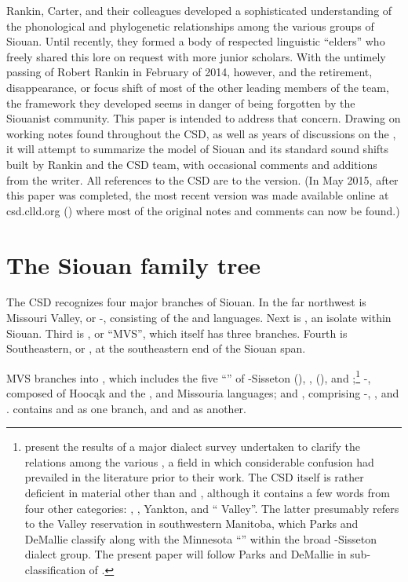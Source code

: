\documentclass[output=paper]{LSP/langsci}
\begin{document}
Rankin, Carter, and their colleagues developed a sophisticated understanding of the phonological and phylogenetic relationships among the various groups of Siouan.  Until recently, they formed a body of respected linguistic ``elders'' who freely shared this lore on request with more junior scholars.  With the untimely passing of Robert Rankin in February of 2014, however, and the retirement, disappearance, or focus shift of most of the other leading members of the team, the framework they developed seems in danger of being forgotten by the Siouanist community.  This paper is intended to address that concern.  Drawing on working notes found throughout the CSD, as well as years of discussions on the , it will attempt to summarize the model of Siouan  and its standard sound shifts built by Rankin and the CSD team, with occasional comments and additions from the writer.  All references to the CSD are to the \citeyear{Rankinetal2006PDF} version. (In May 2015, after this paper was completed, the most recent version was made available online at csd.clld.org (\citealt{Rankinetal2015AccessMay}) where most of the original notes and comments can now be found.)


\section{The Siouan family tree}

The CSD recognizes four major branches of Siouan. In the far northwest is Missouri Valley, or -, consisting of the  and  languages. Next is , an isolate within Siouan. Third is , or ``MVS'', which itself has three branches. Fourth is Southeastern, or , at the southeastern end of the Siouan span.

MVS branches into , which includes the five ``''  of -Sisseton (), ,  (),  and ;\footnote{\citet{ParksDeMallie1992} present the results of a major dialect survey undertaken to clarify the relations among the various  , a field in which considerable confusion had prevailed in the literature prior to their work.  The CSD itself is rather deficient in  material other than  and , although it contains a few words from four other categories: , , Yankton, and `` Valley''.  The latter presumably refers to the  Valley reservation in southwestern Manitoba, which Parks and DeMallie classify along with the Minnesota ``'' within the broad -Sisseton dialect group.  The present paper will follow Parks and DeMallie in sub-classification of .}  -, composed of Hooc\k{a}k and the ,  and Missouria languages; and , comprising -, ,  and .   contains  and  as one branch, and  and  as another.
\end{document}
